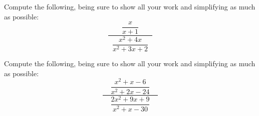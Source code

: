 \documentclass[11pt,letterpaper]{article}
\begin{document}
\newpage





 Compute the following, being sure to show all your work and simplifying as much as possible:
	\[
	\dfrac{\phantom{.}\;\;\;\;\;\;\dfrac{x}{x + 1}\;\;\;\;\;\;\phantom{.}}{\dfrac{x^2 + 4x}{x^2 + 3x + 2}}
	\] \pspace





\newpage





 Compute the following, being sure to show all your work and simplifying as much as possible:
	\[
	\dfrac{\phantom{.}\;\;\;\dfrac{x^2 + x - 6}{x^2 + 2x - 24}\;\;\;\phantom{.}}{\dfrac{2x^2 + 9x + 9}{x^2 + x - 30}}
	\] \pspace


\end{document}
